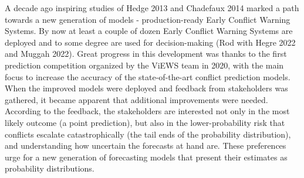 \documentclass[runningheads]{llncs}
\begin{document}

    A decade ago inspiring studies of Hedge 2013 and Chadefaux 2014 marked a path towards a new generation of models - production-ready Early Conflict Warning Systems. By now at least a couple of dozen Early Conflict Warning Systems are deployed and to some degree are used for decision-making (Rod with Hegre 2022 and Muggah 2022). Great progress in this development was thanks to the first prediction competition organized by the ViEWS team in 2020, with the main focus to increase the accuracy of the state-of-the-art conflict prediction models. When the improved models were deployed and feedback from stakeholders was gathered, it became apparent that additional improvements were needed. According to the feedback, the stakeholders are interested not only in the most likely outcome (a point prediction), but also in the lower-probability risk that conflicts escalate catastrophically (the tail ends of the probability distribution), and understanding how uncertain the forecasts at hand are. These preferences urge for a new generation of forecasting models that present their estimates as probability distributions.









\end{document}
